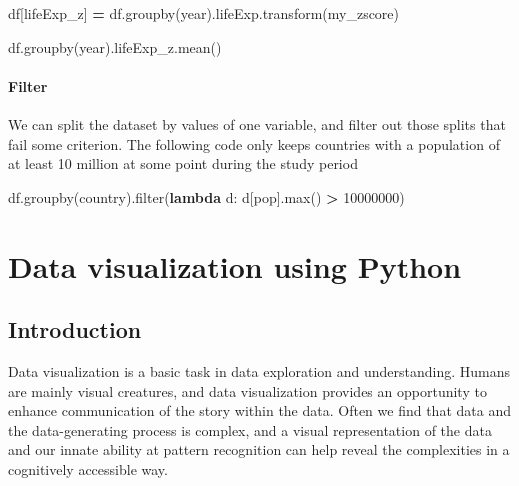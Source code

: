 \documentclass[
  letterpaper,
]{scrbook}
\newenvironment{Shaded}{\begin{snugshade}}{\end{snugshade}}
\newcommand{\BuiltInTok}[1]{#1}
\newcommand{\DecValTok}[1]{\textcolor[rgb]{0.00,0.00,0.81}{#1}}
\newcommand{\KeywordTok}[1]{\textcolor[rgb]{0.13,0.29,0.53}{\textbf{#1}}}
\newcommand{\NormalTok}[1]{#1}
\newcommand{\OperatorTok}[1]{\textcolor[rgb]{0.81,0.36,0.00}{\textbf{#1}}}
\newcommand{\StringTok}[1]{\textcolor[rgb]{0.31,0.60,0.02}{#1}}
\begin{document}
\begin{Shaded}
\begin{Highlighting}[]
\NormalTok{df[}\StringTok{\textquotesingle{}lifeExp\_z\textquotesingle{}}\NormalTok{] }\OperatorTok{=}\NormalTok{ df.groupby(}\StringTok{\textquotesingle{}year\textquotesingle{}}\NormalTok{).lifeExp.transform(my\_zscore)}
\end{Highlighting}
\end{Shaded}

\begin{Shaded}
\begin{Highlighting}[]
\NormalTok{df.groupby(}\StringTok{\textquotesingle{}year\textquotesingle{}}\NormalTok{).lifeExp\_z.mean()}
\end{Highlighting}
\end{Shaded}

\hypertarget{filter}{%
\subsubsection{Filter}\label{filter}}

We can split the dataset by values of one variable, and filter out those splits that fail some criterion. The following code only keeps countries with a population of at least 10 million at some point during the study period

\begin{Shaded}
\begin{Highlighting}[]
\NormalTok{df.groupby(}\StringTok{\textquotesingle{}country\textquotesingle{}}\NormalTok{).}\BuiltInTok{filter}\NormalTok{(}\KeywordTok{lambda}\NormalTok{ d: d[}\StringTok{\textquotesingle{}pop\textquotesingle{}}\NormalTok{].}\BuiltInTok{max}\NormalTok{() }\OperatorTok{\textgreater{}} \DecValTok{10000000}\NormalTok{)}
\end{Highlighting}
\end{Shaded}

\hypertarget{data-visualization-using-python}{%
\chapter{Data visualization using Python}\label{data-visualization-using-python}}

\hypertarget{introduction-2}{%
\section{Introduction}\label{introduction-2}}

Data visualization is a basic task in data exploration and understanding. Humans are mainly visual creatures, and data visualization provides an opportunity to enhance communication of the story within the data. Often we find that data and the data-generating process is complex, and a visual representation of the data and our innate ability at pattern recognition can help reveal the complexities in a cognitively accessible way.
\end{document}

